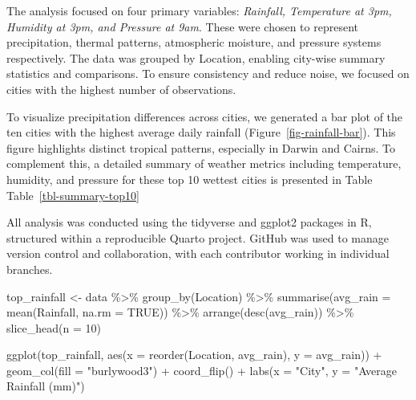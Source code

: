 \documentclass[
  letterpaper,
  DIV=11,
  numbers=noendperiod]{scrartcl}
\newenvironment{Shaded}{\begin{snugshade}}{\end{snugshade}}
\newcommand{\AttributeTok}[1]{\textcolor[rgb]{0.40,0.45,0.13}{#1}}
\newcommand{\ConstantTok}[1]{\textcolor[rgb]{0.56,0.35,0.01}{#1}}
\newcommand{\DecValTok}[1]{\textcolor[rgb]{0.68,0.00,0.00}{#1}}
\newcommand{\FunctionTok}[1]{\textcolor[rgb]{0.28,0.35,0.67}{#1}}
\newcommand{\NormalTok}[1]{\textcolor[rgb]{0.00,0.23,0.31}{#1}}
\newcommand{\OtherTok}[1]{\textcolor[rgb]{0.00,0.23,0.31}{#1}}
\newcommand{\SpecialCharTok}[1]{\textcolor[rgb]{0.37,0.37,0.37}{#1}}
\newcommand{\StringTok}[1]{\textcolor[rgb]{0.13,0.47,0.30}{#1}}
\begin{document}
The analysis focused on four primary variables: \emph{Rainfall,
Temperature at 3pm, Humidity at 3pm, and Pressure at 9am}. These were
chosen to represent precipitation, thermal patterns, atmospheric
moisture, and pressure systems respectively. The data was grouped by
Location, enabling city-wise summary statistics and comparisons. To
ensure consistency and reduce noise, we focused on cities with the
highest number of observations.

To visualize precipitation differences across cities, we generated a bar
plot of the ten cities with the highest average daily rainfall
(Figure~\ref{fig-rainfall-bar}). This figure highlights distinct
tropical patterns, especially in Darwin and Cairns. To complement this,
a detailed summary of weather metrics including temperature, humidity,
and pressure for these top 10 wettest cities is presented in Table
Table~\ref{tbl-summary-top10}

All analysis was conducted using the tidyverse and ggplot2 packages in
R, structured within a reproducible Quarto project. GitHub was used to
manage version control and collaboration, with each contributor working
in individual branches.

\begin{Shaded}
\begin{Highlighting}[]
\NormalTok{top\_rainfall }\OtherTok{\textless{}{-}}\NormalTok{ data }\SpecialCharTok{\%\textgreater{}\%}
  \FunctionTok{group\_by}\NormalTok{(Location) }\SpecialCharTok{\%\textgreater{}\%}
  \FunctionTok{summarise}\NormalTok{(}\AttributeTok{avg\_rain =} \FunctionTok{mean}\NormalTok{(Rainfall, }\AttributeTok{na.rm =} \ConstantTok{TRUE}\NormalTok{)) }\SpecialCharTok{\%\textgreater{}\%}
  \FunctionTok{arrange}\NormalTok{(}\FunctionTok{desc}\NormalTok{(avg\_rain)) }\SpecialCharTok{\%\textgreater{}\%}
  \FunctionTok{slice\_head}\NormalTok{(}\AttributeTok{n =} \DecValTok{10}\NormalTok{)}

\FunctionTok{ggplot}\NormalTok{(top\_rainfall, }\FunctionTok{aes}\NormalTok{(}\AttributeTok{x =} \FunctionTok{reorder}\NormalTok{(Location, avg\_rain), }\AttributeTok{y =}\NormalTok{ avg\_rain)) }\SpecialCharTok{+}
  \FunctionTok{geom\_col}\NormalTok{(}\AttributeTok{fill =} \StringTok{"burlywood3"}\NormalTok{) }\SpecialCharTok{+}
  \FunctionTok{coord\_flip}\NormalTok{() }\SpecialCharTok{+}
  \FunctionTok{labs}\NormalTok{(}\AttributeTok{x =} \StringTok{"City"}\NormalTok{, }\AttributeTok{y =} \StringTok{"Average Rainfall (mm)"}\NormalTok{)}
\end{Highlighting}
\end{Shaded}
\end{document}
